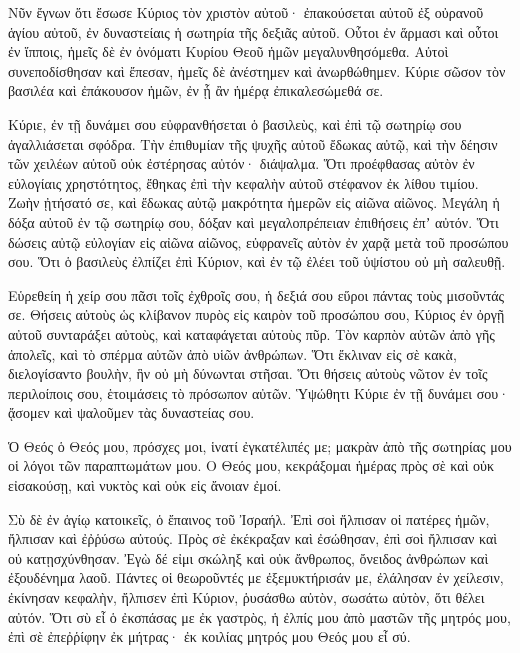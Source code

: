 \begin{spacing}{1.1}
\begin{multicols}{2}
Νῦν ἔγνων ὅτι ἔσωσε Κύριος τὸν χριστὸν αὐτοῦ· ἐπακούσεται αὐτοῦ ἐξ οὐρανοῦ ἁγίου αὐτοῦ, ἐν δυναστείαις ἡ σωτηρία τῆς δεξιᾶς αὐτοῦ.
Οὗτοι ἐν ἅρμασι καὶ οὗτοι ἐν ἵπποις, ἡμεῖς δὲ ἐν ὀνόματι Κυρίου Θεοῦ ἡμῶν μεγαλυνθησόμεθα.
Αὐτοὶ συνεποδίσθησαν καὶ ἔπεσαν, ἡμεῖς δὲ ἀνέστημεν καὶ ἀνωρθώθημεν.
Κύριε σῶσον τὸν βασιλέα καὶ ἐπάκουσον ἡμῶν, ἐν ᾗ ἂν ἡμέρᾳ ἐπικαλεσώμεθά σε.

Κύριε, ἐν τῇ δυνάμει σου εὐφρανθήσεται ὁ βασιλεὺς, καὶ ἐπὶ τῷ σωτηρίῳ σου ἀγαλλιάσεται σφόδρα.
Τὴν ἐπιθυμίαν τῆς ψυχῆς αὐτοῦ ἔδωκας αὐτῷ, καὶ τὴν δέησιν τῶν χειλέων αὐτοῦ οὐκ ἐστέρησας αὐτόν· διάψαλμα.
Ὅτι προέφθασας αὐτὸν ἐν εὐλογίαις χρηστότητος, ἔθηκας ἐπὶ τὴν κεφαλὴν αὐτοῦ στέφανον ἐκ λίθου τιμίου.
Ζωὴν ᾐτήσατό σε, καὶ ἔδωκας αὐτῷ μακρότητα ἡμερῶν εἰς αἰῶνα αἰῶνος.
Μεγάλη ἡ δόξα αὐτοῦ ἐν τῷ σωτηρίῳ σου, δόξαν καὶ μεγαλοπρέπειαν ἐπιθήσεις ἐπʼ αὐτόν.
Ὅτι δώσεις αὐτῷ εὐλογίαν εἰς αἰῶνα αἰῶνος, εὐφρανεῖς αὐτὸν ἐν χαρᾷ μετὰ τοῦ προσώπου σου.
Ὅτι ὁ βασιλεὺς ἐλπίζει ἐπὶ Κύριον, καὶ ἐν τῷ ἐλέει τοῦ ὑψίστου οὐ μὴ σαλευθῇ.

Εὑρεθείη ἡ χείρ σου πᾶσι τοῖς ἐχθροῖς σου, ἡ δεξιά σου εὕροι πάντας τοὺς μισοῦντάς σε.
Θήσεις αὐτοὺς ὡς κλίβανον πυρὸς εἰς καιρὸν τοῦ προσώπου σου, Κύριος ἐν ὀργῇ αὐτοῦ συνταράξει αὐτοὺς, καὶ καταφάγεται αὐτοὺς πῦρ.
Τὸν καρπὸν αὐτῶν ἀπὸ γῆς ἀπολεῖς, καὶ τὸ σπέρμα αὐτῶν ἀπὸ υἱῶν ἀνθρώπων.
Ὅτι ἔκλιναν εἰς σὲ κακὰ, διελογίσαντο βουλὴν, ἣν οὐ μὴ δύνωνται στῆσαι.
Ὅτι θήσεις αὐτοὺς νῶτον ἐν τοῖς περιλοίποις σου, ἑτοιμάσεις τὸ πρόσωπον αὐτῶν.
Ὑψώθητι Κύριε ἐν τῇ δυνάμει σου· ᾄσομεν καὶ ψαλοῦμεν τὰς δυναστείας σου.

Ὁ Θεός ὁ Θεός μου, πρόσχες μοι, ἱνατί ἐγκατέλιπές με; μακρὰν ἀπὸ τῆς σωτηρίας μου οἱ λόγοι τῶν παραπτωμάτων μου.
Ο Θεός μου, κεκράξομαι ἡμέρας πρὸς σὲ καὶ οὐκ εἰσακούσῃ, καὶ νυκτὸς καὶ οὐκ εἰς ἄνοιαν ἐμοί.

Σὺ δὲ ἐν ἁγίῳ κατοικεῖς, ὁ ἔπαινος τοῦ Ἰσραήλ.
Ἐπὶ σοὶ ἤλπισαν οἱ πατέρες ἡμῶν, ἤλπισαν καὶ ἐῤῥύσω αὐτούς.
Πρὸς σὲ ἐκέκραξαν καὶ ἐσώθησαν, ἐπὶ σοὶ ἤλπισαν καὶ οὐ κατῃσχύνθησαν.
Ἐγὼ δέ εἰμι σκώληξ καὶ οὐκ ἄνθρωπος, ὄνειδος ἀνθρώπων καὶ ἐξουδένημα λαοῦ.
Πάντες οἱ θεωροῦντές με ἐξεμυκτήρισάν με, ἐλάλησαν ἐν χείλεσιν, ἐκίνησαν κεφαλὴν,
ἤλπισεν ἐπὶ Κύριον, ῥυσάσθω αὐτὸν, σωσάτω αὐτὸν, ὅτι θέλει αὐτόν.
Ὅτι σὺ εἶ ὁ ἐκσπάσας με ἐκ γαστρὸς, ἡ ἐλπίς μου ἀπὸ μαστῶν τῆς μητρός μου,
ἐπὶ σὲ ἐπεῤῥίφην ἐκ μήτρας· ἐκ κοιλίας μητρός μου Θεός μου εἶ σύ.


\end{multicols}
\end{spacing}

